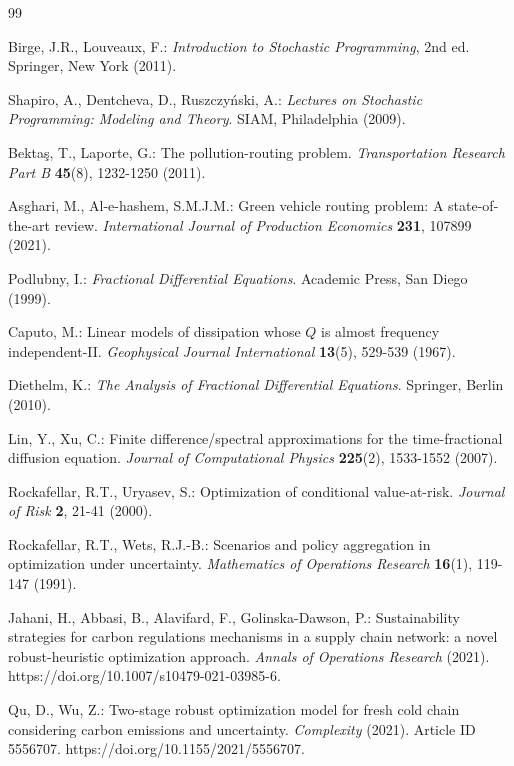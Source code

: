 \begin{thebibliography}{99}

Birge, J.R., Louveaux, F.: \emph{Introduction to Stochastic Programming}, 2nd ed. Springer, New York (2011).

Shapiro, A., Dentcheva, D., Ruszczy\'nski, A.: \emph{Lectures on Stochastic Programming: Modeling and Theory}. SIAM, Philadelphia (2009).

Bekta\c{s}, T., Laporte, G.: The pollution-routing problem. \emph{Transportation Research Part B} \textbf{45}(8), 1232-1250 (2011).

Asghari, M., Al-e-hashem, S.M.J.M.: Green vehicle routing problem: A state-of-the-art review. \emph{International Journal of Production Economics} \textbf{231}, 107899 (2021).

Podlubny, I.: \emph{Fractional Differential Equations}. Academic Press, San Diego (1999).

Caputo, M.: Linear models of dissipation whose $Q$ is almost frequency independent-II. \emph{Geophysical Journal International} \textbf{13}(5), 529-539 (1967).

Diethelm, K.: \emph{The Analysis of Fractional Differential Equations}. Springer, Berlin (2010).

Lin, Y., Xu, C.: Finite difference/spectral approximations for the time-fractional diffusion equation. \emph{Journal of Computational Physics} \textbf{225}(2), 1533-1552 (2007).

Rockafellar, R.T., Uryasev, S.: Optimization of conditional value-at-risk. \emph{Journal of Risk} \textbf{2}, 21-41 (2000).

Rockafellar, R.T., Wets, R.J.-B.: Scenarios and policy aggregation in optimization under uncertainty. \emph{Mathematics of Operations Research} \textbf{16}(1), 119-147 (1991).

Jahani, H., Abbasi, B., Alavifard, F., Golinska-Dawson, P.: Sustainability strategies for carbon regulations mechanisms in a supply chain network: a novel robust-heuristic optimization approach. \emph{Annals of Operations Research} (2021). https://doi.org/10.1007/s10479-021-03985-6.

Qu, D., Wu, Z.: Two-stage robust optimization model for fresh cold chain considering carbon emissions and uncertainty. \emph{Complexity} (2021). Article ID 5556707. https://doi.org/10.1155/2021/5556707.


\end{thebibliography}
